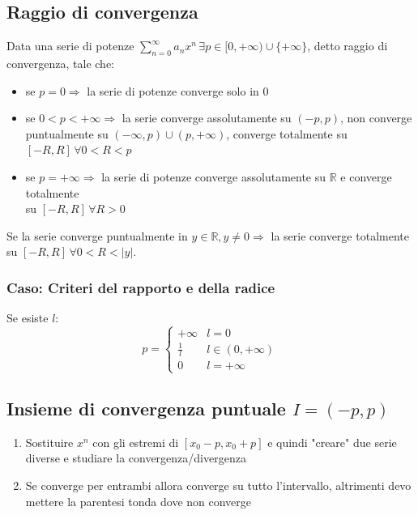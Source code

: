 \documentclass[12pt, a4paper]{article}
\begin{document}
    \subsection{Raggio di convergenza}
        Data una serie di potenze $\sum_{n=0}^{\infty}a_n x^n \, \exists p \in [0,+\infty)\cup\{+\infty\}$, detto raggio di convergenza, tale che:
        \begin{itemize}
            \item se $p=0 \Rightarrow$ la serie di potenze converge solo in 0
            \item se $0<p<+\infty \Rightarrow$ la serie converge assolutamente su $(-p,p)$, non converge puntualmente su $(-\infty,p)\cup(p,+\infty)$, converge totalmente su $[-R,R] \,\forall 0<R<p$
            \item se $p=+\infty \Rightarrow$ la serie di potenze converge assolutamente su $\mathbb{R}$ e converge totalmente\\
            su $[-R,R] \, \forall R>0$
        \end{itemize}
        Se la serie converge puntualmente in $y\in\mathbb{R}, y\neq 0 \Rightarrow$ la serie converge totalmente su $[-R,R]\, \forall 0<R<\left|y\right|$.
        \subsubsection{Caso: Criteri del rapporto e della radice}
            Se esiste $l$:
            \begin{equation*}
                p=\begin{cases}
                    +\infty & l = 0\\
                    \frac{1}{l} & l\in(0,+\infty)\\
                    0  & l = +\infty
                \end{cases}
            \end{equation*}
    \subsection{Insieme di convergenza puntuale $I=(-p,p)$}
        \begin{enumerate}
            \item Sostituire $x^n$ con gli estremi di $\left[x_0-p,x_0+p\right]$ e quindi "creare" due serie diverse e studiare la convergenza/divergenza
            \item Se converge per entrambi allora converge su tutto l'intervallo, altrimenti devo mettere la parentesi tonda dove non converge
        \end{enumerate}
\end{document}
